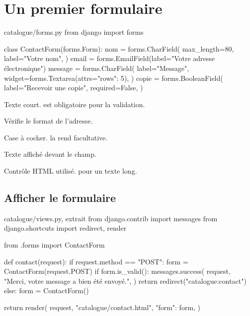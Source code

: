 \section{Un premier formulaire}

\begin{codebox}[python]{catalogue/forms.py}
from django import forms


class ContactForm(forms.Form):
    nom = forms.CharField(
        max_length=80,
        label="Votre nom",
    )
    email = forms.EmailField(label="Votre adresse électronique")
    message = forms.CharField(
        label="Message",
        widget=forms.Textarea(attrs={"rows": 5}),
    )
    copie = forms.BooleanField(
        label="Recevoir une copie",
        required=False,
    )
\end{codebox}

\begin{description}[leftmargin=3.9cm,style=nextline]
  \item[\code{CharField}] Texte court.  est obligatoire pour la
  validation.
  \item[\code{EmailField}] Vérifie le format de l'adresse.
  \item[\code{BooleanField}] Case à cocher.  la rend
  facultative.
  \item[\code{label}] Texte affiché devant le champ.
  \item[\code{widget}] Contrôle HTML utilisé.  pour un texte long.
\end{description}

\subsection{Afficher le formulaire}

\begin{codebox}[python]{catalogue/views.py, extrait}
from django.contrib import messages
from django.shortcuts import redirect, render

from .forms import ContactForm


def contact(request):
    if request.method == "POST":
        form = ContactForm(request.POST)
        if form.is_valid():
            messages.success(
                request,
                "Merci, votre message a bien été envoyé.",
            )
            return redirect("catalogue:contact")
    else:
        form = ContactForm()

    return render(
        request,
        "catalogue/contact.html",
        {"form": form},
    )
\end{codebox}

